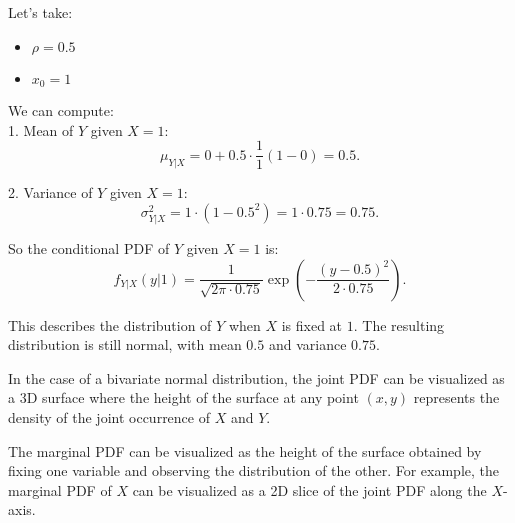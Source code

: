 \begin{example}
Let’s take:
\begin{itemize}
    \item \( \rho = 0.5 \)
    \item \( x_0 = 1 \)
\end{itemize}

We can compute:\\
1. Mean of \( Y \) given \( X = 1 \):
   \[
   \mu_{Y|X} = 0 + 0.5 \cdot \frac{1}{1}(1 - 0) = 0.5.
   \]

2. Variance of \( Y \) given \( X = 1 \):
   \[
   \sigma_{Y|X}^2 = 1 \cdot (1 - 0.5^2) = 1 \cdot 0.75 = 0.75.
   \]

So the conditional PDF of \( Y \) given \( X = 1 \) is:
\[
f_{Y|X}(y|1) = \frac{1}{\sqrt{2\pi \cdot 0.75}} \exp\left(-\frac{(y - 0.5)^2}{2 \cdot 0.75}\right).
\]

This describes the distribution of \( Y \) when \( X \) is fixed at \( 1 \). The resulting distribution is still normal, with mean \( 0.5 \) and variance \( 0.75 \).

\end{example}

In the case of a bivariate normal distribution, the joint PDF can be visualized as a 3D surface where the height of the surface at any point \( (x, y) \) represents the density of the joint occurrence of \( X \) and \( Y \).

\begin{center}
\end{center}

The marginal PDF can be visualized as the height of the surface obtained by fixing one variable and observing the distribution of the other. For example, the marginal PDF of \( X \) can be visualized as a 2D slice of the joint PDF along the \( X \)-axis. 
\begin{center}
\end{center}

